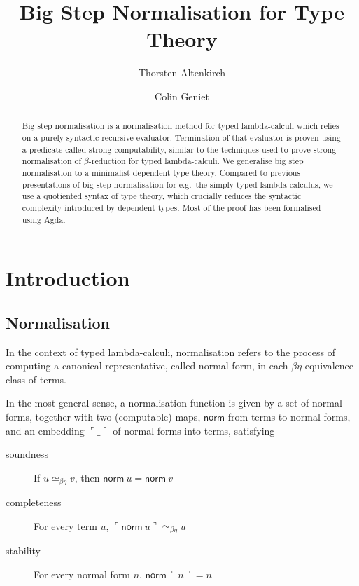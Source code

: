 \documentclass[a4paper,UKenglish,cleveref]{lipics-v2019}
\title{Big Step Normalisation for Type Theory}
\author{Thorsten Altenkirch}
{School for Computer Science, University of Nottingham, United Kingdom}
{txa@cs.nott.ac.uk}{}
{supported by COST Action EUTypes CA15123 and USAF, Airforce office for
  scientific research, award FA9550-16-1-0029}
\author{Colin Geniet}
{Computer Science Department, ENS Paris-Saclay, France}
{colin.geniet@ens-paris-saclay.fr}{}{}
\newcommand{\agdaSymb}[1]{\mathsf{#1}}
\newcommand{\norm}{\agdaSymb{norm}}
\newcommand{\cul}{\ulcorner}
\newcommand{\cur}{\urcorner}
\newcommand{\Beq}{\simeq_{\beta\eta}}
\begin{document}
\maketitle

\begin{abstract}
  Big step normalisation is a normalisation method for typed lambda-calculi
  which relies on a purely syntactic recursive evaluator. Termination of that
  evaluator is proven using a predicate called strong computability, similar to
  the techniques used to prove strong normalisation of $\beta$-reduction for
  typed lambda-calculi. We generalise big step normalisation to a minimalist
  dependent type theory. Compared to previous presentations of big step
  normalisation for e.g.\ the simply-typed lambda-calculus, we use a quotiented
  syntax of type theory, which crucially reduces the syntactic complexity
  introduced by dependent types. Most of the proof has been formalised using
  Agda.
\end{abstract}

\section{Introduction}
\subsection{Normalisation}
In the context of typed lambda-calculi, normalisation refers to the process of
computing a canonical representative, called normal form, in each
$\beta\eta$-equivalence class of terms.

In the most general sense, a normalisation function is given by a set of normal
forms, together with two (computable) maps, $\norm$ from terms to normal forms,
and an embedding $\cul\_\cur$ of normal forms into terms, satisfying
\begin{description}
\item[soundness] If $u \Beq v$, then $\norm\ u = \norm\ v$
\item[completeness\footnotemark] For every term $u$, $\cul \norm\ u \cur \Beq u$
\item[stability] For every normal form $n$, $\norm\ \cul n \cur = n$
\end{description}%
\end{document}
